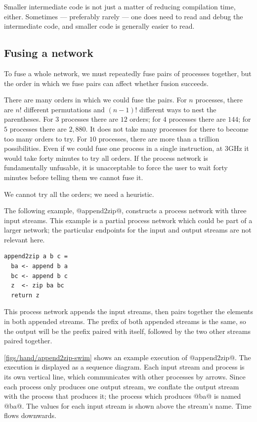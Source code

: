 Smaller intermediate code is not just a matter of reducing compilation time, either.
Sometimes --- preferably rarely --- one does need to read and debug the intermediate code, and smaller code is generally easier to read.

\subsection{Fusing a network}
To fuse a whole network, we must repeatedly fuse pairs of processes together, but the order in which we fuse pairs can affect whether fusion succeeds.


There are many orders in which we could fuse the pairs.
For $n$ processes, there are $n!$ different permutations and $(n-1)!$ different ways to nest the parentheses.
For $3$ processes there are $12$ orders; for $4$ processes there are $144$; for $5$ processes there are $2,880$.
It does not take many processes for there to become too many orders to try.
For $10$ processes, there are more than a trillion possibilities.
Even if we could fuse one process in a single instruction, at 3GHz it would take forty minutes to try all orders.
If the process network is fundamentally unfusable, it is unacceptable to force the user to wait forty minutes before telling them we cannot fuse it.

We cannot try all the orders; we need a heuristic.

The following example, @append2zip@, constructs a process network with three input streams.
This example is a partial process network which could be part of a larger network; the particular endpoints for the input and output streams are not relevant here.

\begin{lstlisting}
append2zip a b c =
  ba <- append b a
  bc <- append b c
  z  <- zip ba bc
  return z
\end{lstlisting}

This process network appends the input streams, then pairs together the elements in both appended streams.
The prefix of both appended streams is the same, so the output will be the prefix paired with itself, followed by the two other streams paired together.


\autoref{figs/hand/append2zip-swim} shows an example execution of @append2zip@.
The execution is displayed as a sequence diagram.
Each input stream and process is its own vertical line, which communicates with other processes by arrows.
Since each process only produces one output stream, we conflate the output stream with the process that produces it; the process which produces @ba@ is named @ba@. 
The values for each input stream is shown above the stream's name.
Time flows downwards.

